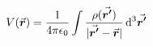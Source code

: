 

\vspace*{\fill}
\centering

\begin{align*}
    V(\va*{r}) = \frac{1}{4 \pi \epsilon_0} \int \frac{\rho(\va*{r'})}{|\va*{r'} - \va*{r}|} \dd[3]{\va*{r'}}
\end{align*}

\centering
\vspace*{\fill}

